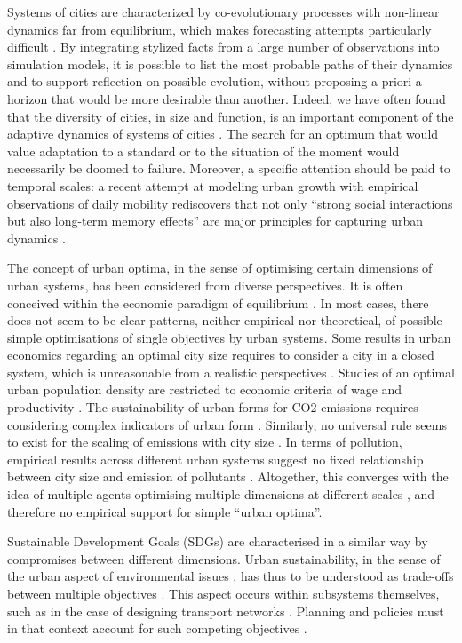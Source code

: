 \documentclass[final,5p,times,twocolumn,authoryear]{elsarticle}
\begin{document}
Systems of cities are characterized by co-evolutionary processes with non-linear dynamics far from equilibrium, which makes forecasting attempts particularly difficult \citep{raimbault2020unveiling}. By integrating stylized facts from a large number of observations into simulation models, it is possible to list the most probable paths of their dynamics and to support reflection on possible evolution, without proposing a priori a horizon that would be more desirable than another. Indeed, we have often found that the diversity of cities, in size and function, is an important component of the adaptive dynamics of systems of cities \citep{pumain2021co}. The search for an optimum that would value adaptation to a standard or to the situation of the moment would necessarily be doomed to failure. Moreover, a specific attention should be paid to temporal scales: a recent attempt at modeling urban growth with empirical observations of daily mobility rediscovers that not only ``strong social interactions but also long-term memory effects'' are major principles for capturing urban dynamics \citep{xu2021emergence}.

The concept of urban optima, in the sense of optimising certain dimensions of urban systems, has been considered from diverse perspectives. It is often conceived within the economic paradigm of equilibrium \citep{glaeser2008cities}. In most cases, there does not seem to be clear patterns, neither empirical nor theoretical, of possible simple optimisations of single objectives by urban systems. Some results in urban economics regarding an optimal city size requires to consider a city in a closed system, which is unreasonable from a realistic perspectives \citep{singell1974optimum}. Studies of an optimal urban population density are restricted to economic criteria of wage and productivity \citep{su2017density}. The sustainability of urban forms for CO2 emissions requires considering complex indicators of urban form \citep{le2012urban}. Similarly, no universal rule seems to exist for the scaling of emissions with city size \citep{gudipudi2019urban}. In terms of pollution, empirical results across different urban systems suggest no fixed relationship between city size and emission of pollutants \citep{han2016optimum}. Altogether, this converges with the idea of multiple agents optimising multiple dimensions at different scales \citep{pumain2008socio}, and therefore no empirical support for simple ``urban optima''.

Sustainable Development Goals (SDGs) are characterised in a similar way by compromises between different dimensions. Urban sustainability, in the sense of the urban aspect of environmental issues \citep{finco2001pathways}, has thus to be understood as trade-offs between multiple objectives \citep{viguie2012trade}. This aspect occurs within subsystems themselves, such as in the case of designing transport networks \citep{sharma2011multiobjective}. Planning and policies must in that context account for such competing objectives \citep{caparros2015optimised}.
\end{document}
